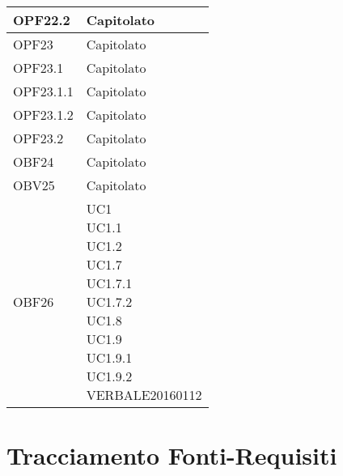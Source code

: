\documentclass{scalatekids-article}
\begin{document}
\begin{longtable}[H]{|p{5.5cm}|p{5.5cm}|}
  \hline
  OPF22.2 & \multiLineCell[t]{Capitolato\\}\\
  \hline
  OPF23 & \multiLineCell[t]{Capitolato\\}\\
  \hline
  OPF23.1 & \multiLineCell[t]{Capitolato\\}\\
  \hline
  OPF23.1.1 & \multiLineCell[t]{Capitolato\\}\\
  \hline
  OPF23.1.2 & \multiLineCell[t]{Capitolato\\}\\
  \hline
  OPF23.2 & \multiLineCell[t]{Capitolato\\}\\
  \hline
  OBF24 & \multiLineCell[t]{Capitolato\\}\\
  \hline
  OBV25 & \multiLineCell[t]{Capitolato\\}\\
  \hline
  OBF26 & \multiLineCell[t]{UC1\\UC1.1\\UC1.2\\UC1.7\\UC1.7.1\\UC1.7.2\\UC1.8\\UC1.9\\UC1.9.1\\UC1.9.2\\VERBALE20160112\\}\\
  \hline
\end{longtable}
\newpage

\section{Tracciamento Fonti-Requisiti}
\end{document}
